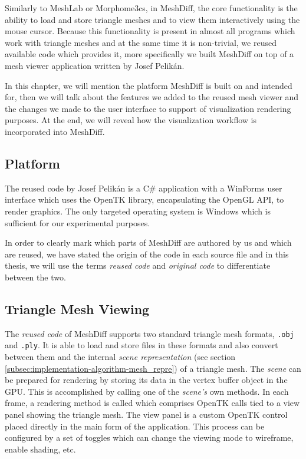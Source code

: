 Similarly to MeshLab or Morphome3cs, in MeshDiff, the core functionality is the ability to load and store triangle meshes and to view them interactively using the mouse cursor. Because this functionality is present in almost all programs which work with triangle meshes and at the same time it is non-trivial, we reused available code which provides it, more specifically we built MeshDiff on top of a mesh viewer application written by Josef Pelikán.

In this chapter, we will mention the platform MeshDiff is built on and intended for, then we will talk about the features we added to the reused mesh viewer and the changes we made to the user interface to support of visualization rendering purposes. At the end, we will reveal how the visualization workflow is incorporated into MeshDiff.

\subsection{Platform}
\label{subsec:implementation-architecture-platform}

The reused code by Josef Pelikán is a C\# application with a WinForms user interface which uses the OpenTK library, encapsulating the OpenGL API, to render graphics. The only targeted operating system is Windows which is sufficient for our experimental purposes.

In order to clearly mark which parts of MeshDiff are authored by us and which are reused, we have stated the origin of the code in each source file and in this thesis, we will use the terms {\it reused code} and {\it original code} to differentiate between the two.

\subsection{Triangle Mesh Viewing}
\label{subsec:implementation-architecture-mesh_viewing}

The {\it reused code} of MeshDiff supports two standard triangle mesh formats, \verb+.obj+ and \verb+.ply+. It is able to load and store files in these formats and also convert between them and the internal {\it scene representation} (see section \ref{subsec:implementation-algorithm-mesh_repre}) of a triangle mesh. The {\it scene} can be prepared for rendering by storing its data in the vertex buffer object in the GPU. This is accomplished by calling one of the {\it scene's} own methods. In each frame, a rendering method is called which comprises OpenTK calls tied to a view panel showing the triangle mesh. The view panel is a custom OpenTK control placed directly in the main form of the application. This process can be configured by a set of toggles which can change the viewing mode to wireframe, enable shading, etc.

